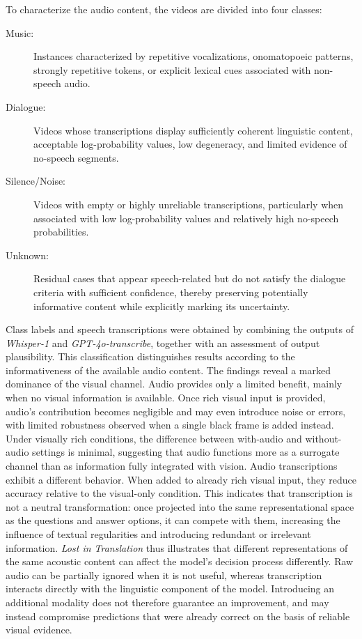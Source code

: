 To characterize the audio content, the videos are divided into four classes:
\begin{description}
\item[Music:] Instances characterized by repetitive vocalizations, onomatopoeic patterns, strongly repetitive tokens, or explicit lexical cues associated with non-speech audio.
\item[Dialogue:] Videos whose transcriptions display sufficiently coherent linguistic content, acceptable log-probability values, low degeneracy, and limited evidence of no-speech segments.
\item[Silence/Noise:] Videos with empty or highly unreliable transcriptions, particularly when associated with low log-probability values and relatively high no-speech probabilities.
\item[Unknown:] Residual cases that appear speech-related but do not satisfy the dialogue criteria with sufficient confidence, thereby preserving potentially informative content while explicitly marking its uncertainty.
\end{description}
Class labels and speech transcriptions were obtained by combining the outputs of \textit{Whisper-1} and \textit{\acs{GPT}-4o-transcribe}, together with an assessment of output plausibility. This classification distinguishes results according to the informativeness of the available audio content.
The findings reveal a marked dominance of the visual channel. Audio provides only a limited benefit, mainly when no visual information is available. Once rich visual input is provided, audio's contribution becomes negligible and may even introduce noise or errors, with limited robustness observed when a single black frame is added instead. Under visually rich conditions, the difference between with-audio and without-audio settings is minimal, suggesting that audio functions more as a surrogate channel than as information fully integrated with vision.
Audio transcriptions exhibit a different behavior. When added to already rich visual input, they reduce accuracy relative to the visual-only condition. This indicates that transcription is not a neutral transformation: once projected into the same representational space as the questions and answer options, it can compete with them, increasing the influence of textual regularities and introducing redundant or irrelevant information.
\textit{Lost in Translation} thus illustrates that different representations of the same acoustic content can affect the model's decision process differently. Raw audio can be partially ignored when it is not useful, whereas transcription interacts directly with the linguistic component of the model. Introducing an additional modality does not therefore guarantee an improvement, and may instead compromise predictions that were already correct on the basis of reliable visual evidence.
